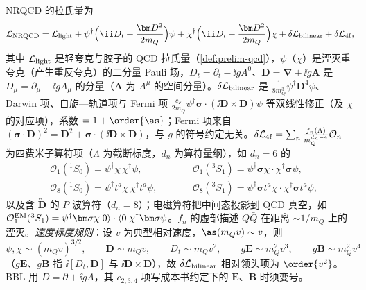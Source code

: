 \begin{definition}\label{def:heavy-nrqcd}
NRQCD 的拉氏量为
\begin{equation}\label{eq:heavy-LNRQCD}
\mathcal L_{\rm NRQCD}=\mathcal L_{\rm light}+\psi^\dagger\Big(\ii D_t+\frac{\bm D^2}{2m_Q}\Big)\psi+\chi^\dagger\Big(\ii D_t-\frac{\bm D^2}{2m_Q}\Big)\chi+\delta\mathcal L_{\rm bilinear}+\delta\mathcal L_{\rm 4f},
\end{equation}
其中 $\mathcal L_{\rm light}$ 是轻夸克与胶子的 QCD 拉氏量（\cref{def:prelim-qcd}），$\psi$（$\chi$）是湮灭重夸克（产生重反夸克）的二分量 Pauli 场，$D_t=\partial_t-\ii gA^0$、$\bm D=\bm\nabla+\ii g\bm A$ 是 $D_\mu=\partial_\mu-\ii gA_\mu$ 的分量（$\bm A$ 为 $A^\mu$ 的空间分量）。$\delta\mathcal L_{\rm bilinear}$ 是 $\frac{1}{8m_Q^3}\psi^\dagger\bm D^4\psi$、Darwin 项、自旋—轨道项与 Fermi 项 $\frac{c_F}{2m_Q}\psi^\dagger\bm\sigma\cdot(\ii\bm D\times\bm D)\psi$ 等双线性修正（及 $\chi$ 的对应项），系数 $=1+\order{\as}$；Fermi 项来自 $(\bm\sigma\cdot\bm D)^2=\bm D^2+\bm\sigma\cdot(\ii\bm D\times\bm D)$，与 $g$ 的符号约定无关。$\delta\mathcal L_{\rm 4f}=\sum_n\frac{f_n(\Lambda)}{m_Q^{d_n-4}}\mathcal O_n$ 为四费米子算符项（$\Lambda$ 为截断标度，$d_n$ 为算符量纲），如 $d_n=6$ 的
\begin{equation}\label{eq:heavy-4f}
\begin{aligned}
&\mathcal O_1({}^1S_0)=\psi^\dagger\chi\,\chi^\dagger\psi,&\qquad&\mathcal O_1({}^3S_1)=\psi^\dagger\bm\sigma\chi\cdot\chi^\dagger\bm\sigma\psi,\\
&\mathcal O_8({}^1S_0)=\psi^\dagger t^a\chi\,\chi^\dagger t^a\psi,&\qquad&\mathcal O_8({}^3S_1)=\psi^\dagger\bm\sigma t^a\chi\cdot\chi^\dagger\bm\sigma t^a\psi,
\end{aligned}
\end{equation}
以及含 $\overleftrightarrow{\bm D}$ 的 $P$ 波算符（$d_n=8$）；电磁算符把中间态投影到 QCD 真空，如 $\mathcal O^{\rm EM}_1({}^3S_1)=\psi^\dagger\bm\sigma\chi|0\rangle\cdot\langle0|\chi^\dagger\bm\sigma\psi$。$f_n$ 的虚部描述 $Q\bar Q$ 在距离 $\sim1/m_Q$ 上的湮灭。\emph{速度标度规则}：设 $v$ 为典型相对速度，$\as(m_Qv)\sim v$，则
\begin{equation}\label{eq:heavy-vscaling}
\psi,\chi\sim(m_Qv)^{3/2},\qquad \bm D\sim m_Qv,\qquad D_t\sim m_Qv^2,\qquad g\bm E\sim m_Q^2v^3,\qquad g\bm B\sim m_Q^2v^4
\end{equation}
（$g\bm E$、$g\bm B$ 指 $\ii[D_t,\bm D]$ 与 $\ii\bm D\times\bm D$），故 $\delta\mathcal L_{\rm bilinear}$ 相对领头项为 $\order{v^2}$。BBL 用 $D=\partial+\ii gA$，其 $c_{2,3,4}$ 项写成本书约定下的 $\bm E$、$\bm B$ 时须变号。
\end{definition}

